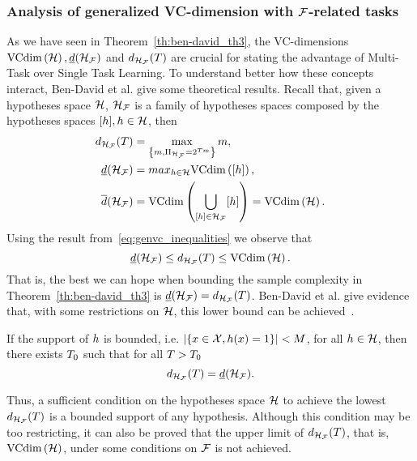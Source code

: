 \subsubsection*{Analysis of generalized VC-dimension with $\mathcal{F}$-related tasks}
As we have seen in Theorem~\ref{th:ben-david_th3}, the VC-dimensions $\text{VCdim}\left(\mathcal{H}\right), \underline{d}(\mathcal{H}_{\mathcal{F}})$ and $d_{\mathcal{H}_{\mathcal{F}}}(T)$ are crucial for stating the advantage of Multi-Task over Single Task Learning. 
To understand better how these concepts interact, Ben-David et al. give some theoretical results.
Recall that, given a hypotheses space $\mathcal{H}$, $\mathcal{H}_{\mathcal{F}}$ is a family of hypotheses spaces composed by the hypotheses spaces $\lbrack h\rbrack, h \in \mathcal{H}$, then
\begin{align*}
    \nonumber
    d_{\mathcal{H}_{\mathcal{F}}}(T) &= \max_{\left\{m ,\Pi_{\mathcal{H}_{\mathcal{F}}} = 2^{T m}\right\} } m, \\
    \underline{d}(\mathcal{H}_{\mathcal{F}}) &= max_{h \in \mathcal{H}} \text{VCdim}\left(\lbrack h\rbrack\right), \\    
    \overline{d}(\mathcal{H}_{\mathcal{F}}) &= \text{VCdim}\left(\bigcup_{\lbrack h\rbrack \in \mathcal{H}_{\mathcal{F}}} \lbrack h\rbrack\right)= \text{VCdim}\left(\mathcal{H}\right).
\end{align*}
Using the result from~\eqref{eq:genvc_inequalities} we observe that
\begin{equation}
    \nonumber
    \underline{d}(\mathcal{H}_{\mathcal{F}}) \leq d_{\mathcal{H}_{\mathcal{F}}}(T) \leq \text{VCdim}\left(\mathcal{H}\right) .
\end{equation}
That is, the best we can hope when bounding the sample complexity in Theorem~\ref{th:ben-david_th3} is $\underline{d}(\mathcal{H}_{\mathcal{F}}) = d_{\mathcal{H}_{\mathcal{F}}}(T)$. 
Ben-David et al. give evidence that, with some restrictions on $\mathcal{H}$, this lower bound can be achieved~\cite[Theorem~4]{Ben-DavidB08}.
\begin{theorem}
    If the support of $h$ is bounded, i.e. $ \left|\left\{x \in \mathcal{X},  h(x) = 1\right\}\right| < M$, for all $h \in \mathcal{H}$, then there exists $T_0$ such that for all $T>T_0$
    \begin{equation}
        \nonumber
        d_{\mathcal{H}_{\mathcal{F}}}(T) = \underline{d}(\mathcal{H}_{\mathcal{F}}).
    \end{equation} 
\end{theorem}
Thus, a sufficient condition on the hypotheses space $\mathcal{H}$ to achieve the lowest $d_{\mathcal{H}_{\mathcal{F}}}(T)$ is a bounded support of any hypothesis. Although this condition may be too restricting, it can also be proved that the upper limit of $d_{\mathcal{H}_{\mathcal{F}}}(T)$, that is, $\text{VCdim}\left(\mathcal{H}\right)$, under some conditions on $\mathcal{F}$ is not achieved. 

